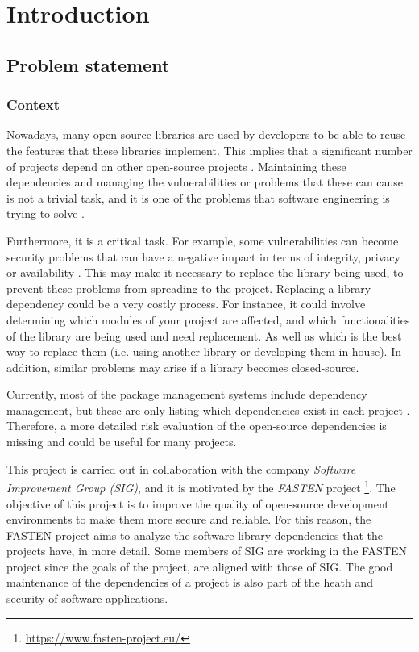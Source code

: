 \chapter{Introduction}\label{ch:Introduction}

\section{Problem statement}

\subsection{Context}
Nowadays, many open-source libraries are used by developers to be able to reuse the features that these libraries implement.
This implies that a significant number of projects depend on other open-source projects \cite{kula2014visualizing}. Maintaining these dependencies and managing the vulnerabilities or problems that these can cause is not a trivial task, and it is one of the problems that software engineering is trying to solve \cite{kula2014visualizing}.

Furthermore, it is a critical task. For example, some vulnerabilities can become security problems that can have a negative impact in terms of integrity, privacy or availability \cite{CVE-FAQ}. This may make it necessary to replace the library being used, to prevent these problems from spreading to the project.
Replacing a library dependency could be a very costly process. For instance, it could involve determining which modules of your project are affected, and which functionalities of the library are being used and need replacement. As well as which is the best way to replace them (i.e. using another library or developing them in-house).
In addition, similar problems may arise if a library becomes closed-source.

\blankl
Currently, most of the package management systems include dependency management, but these are only listing which dependencies exist in each project \cite{hejderup2018prazi}.
Therefore, a more detailed risk evaluation of the open-source dependencies is missing and could be useful for many projects.

This project is carried out in collaboration with the company \textit{Software Improvement Group (SIG)}, and it is motivated by the \textit{FASTEN} project \footnote{\url{https://www.fasten-project.eu/}}. The objective of this project is to improve the quality of open-source development environments to make them more secure and reliable. For this reason, the FASTEN project aims to analyze the software library dependencies that the projects have, in more detail. Some members of SIG are working in the FASTEN project since the goals of the project, are aligned with those of SIG. The good maintenance of the dependencies of a project is also part of the heath and security of software applications.

